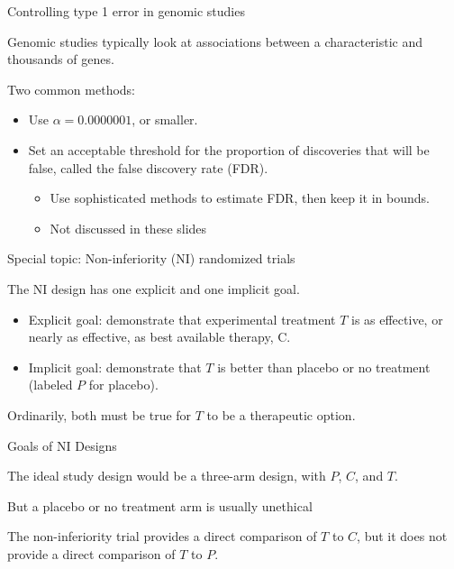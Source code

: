 \documentclass[ignorenonframetext,]{beamer}
\begin{document}
\begin{frame}{Controlling type 1 error in genomic studies}

Genomic studies typically look at associations between a characteristic
and thousands of genes.

Two common methods:

\begin{itemize}
\item
  Use \(\alpha = 0.0000001\), or smaller.
\item
  Set an acceptable threshold for the proportion of discoveries that
  will be false, called the false discovery rate (FDR).

  \begin{itemize}
  \item
    Use sophisticated methods to estimate FDR, then keep it in bounds.
  \item
    Not discussed in these slides
  \end{itemize}
\end{itemize}

\end{frame}

\begin{frame}{Special topic: Non-inferiority (NI) randomized trials}

The NI design has one explicit and one implicit goal.

\begin{itemize}
\item
  Explicit goal: demonstrate that experimental treatment \(T\) is as
  effective, or nearly as effective, as best available therapy, C.
\item
  Implicit goal: demonstrate that \(T\) is better than placebo or no
  treatment (labeled \(P\) for placebo).
\end{itemize}

Ordinarily, both must be true for \(T\) to be a therapeutic option.

\end{frame}

\begin{frame}{Goals of NI Designs}

The ideal study design would be a three-arm design, with \(P\), \(C\),
and \(T\). \medskip

But a placebo or no treatment arm is usually unethical \medskip

The non-inferiority trial provides a direct comparison of \(T\) to
\(C\), but it does not provide a direct comparison of \(T\) to \(P\).

\end{frame}
\end{document}
